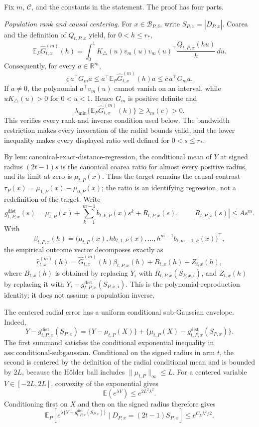 Fix \(m\), \(\mathcal C\), and the constants in the statement.  The proof has four parts.

\emph{Population rank and causal centering.}
For \(x\in\mathcal B_{P,\delta}\), write \(S_{P,x}=|D_{P,x}|\).  Coarea and the definition of \(Q_{t,P,x}\) yield, for \(0<h\leq r_*\),
\[
 \mathbb E_P\widehat G^{(m)}_{t,x}(h)
 =\int_0^1 K_\triangle(u)v_m(u)v_m(u)^\top
 \frac{Q_{t,P,x}(hu)}h\,du.
\]
Consequently, for every \(a\in\mathbb R^m\),
\[
 \underline c\,a^\top G_ma
 \leq a^\top\mathbb E_P\widehat G^{(m)}_{t,x}(h)a
 \leq \overline c\,a^\top G_ma.
\]
If \(a\neq0\), the polynomial \(a^\top v_m(u)\) cannot vanish on an interval, while \(uK_\triangle(u)>0\) for \(0<u<1\).  Hence \(G_m\) is positive definite and
\[
 \lambda_{\min}\{\mathbb E_P\widehat G^{(m)}_{t,x}(h)\}
 \geq\lambda_m(\underline c)>0.
\]
This verifies every rank and inverse condition used below.  The bandwidth restriction makes every invocation of the radial bounds valid, and the lower inequality makes every displayed ratio well defined for \(0<s\leq r_*\).

By \(\mathrm{lem:canonical\text{-}exact\text{-}distance\text{-}regression}\), the conditional mean of \(Y\) at signed radius \((2t-1)s\) is the canonical coarea ratio for almost every positive radius, and its limit at zero is \(\mu_{t,P}(x)\).  Thus the target remains the causal contrast \(\tau_P(x)=\mu_{1,P}(x)-\mu_{0,P}(x)\); the ratio is an identifying regression, not a redefinition of the target.  Write
\[
 g^{\mathrm{dist}}_{t,P,x}(s)
 =\mu_{t,P}(x)+\sum_{k=1}^{m-1}b_{t,k,P}(x)s^k
 +R_{t,P,x}(s),
 \qquad |R_{t,P,x}(s)|\leq As^m.
\]
With
\[
 \beta_{t,P,x}(h)
 =\bigl(\mu_{t,P}(x),hb_{t,1,P}(x),\ldots,
 h^{m-1}b_{t,m-1,P}(x)\bigr)^\top,
\]
the empirical outcome vector decomposes exactly as
\[
 \widehat r^{(m)}_{t,x}(h)
 =\widehat G^{(m)}_{t,x}(h)\beta_{t,P,x}(h)
 +B_{t,x}(h)+Z_{t,x}(h),
\]
where \(B_{t,x}(h)\) is obtained by replacing \(Y_i\) with \(R_{t,P,x}(S_{P,x,i})\), and \(Z_{t,x}(h)\) by replacing it with
\(Y_i-g^{\mathrm{dist}}_{t,P,x}(S_{P,x,i})\).  This is the polynomial-reproduction identity; it does not assume a population inverse.

The centered radial error has a uniform conditional sub-Gaussian envelope.  Indeed,
\[
 Y-g^{\mathrm{dist}}_{t,P,x}(S_{P,x})
 =\{Y-\mu_{t,P}(X)\}
 +\{\mu_{t,P}(X)-g^{\mathrm{dist}}_{t,P,x}(S_{P,x})\}.
\]
The first summand satisfies the conditional exponential inequality in \(\mathrm{ass:conditional\text{-}subgaussian}\).  Conditional on the signed radius in arm \(t\), the second is centered by the definition of the radial conditional mean and is bounded by \(2L\), because the H\"older ball includes \(\|\mu_{t,P}\|_\infty\leq L\).  For a centered variable \(V\in[-2L,2L]\), convexity of the exponential gives
\[
 \mathbb E(e^{\lambda V})\leq e^{2L^2\lambda^2}.
\]
Conditioning first on \(X\) and then on the signed radius therefore gives
\[
 \mathbb E_P\!\left[
 e^{\lambda\{Y-g^{\mathrm{dist}}_{t,P,x}(S_{P,x})\}}
 \mid D_{P,x}=(2t-1)S_{P,x}
 \right]
 \leq e^{C_L\lambda^2/2}.
\]

